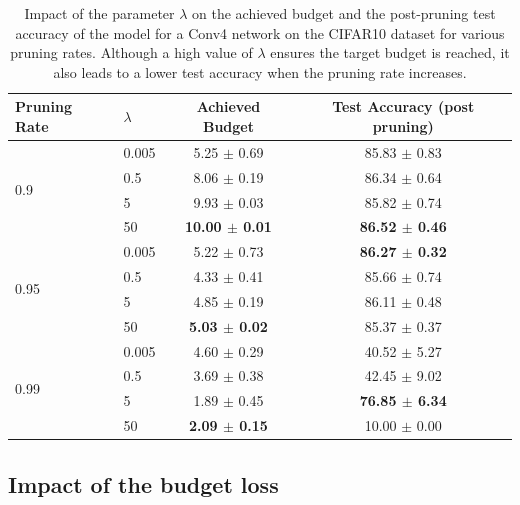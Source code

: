 \begin{table}[tbp]
  \centering
  \begin{center}
    \begin{tabular}{llcc}
      \toprule
      \textbf{Pruning Rate} & \textbf{$\lambda$} & \textbf{Achieved Budget} & \textbf{Test Accuracy (post pruning)} \\
      \midrule
      \multirow{4}{*}{0.9} & 0.005 & 5.25 $\pm$ 0.69 & 85.83 $\pm$ 0.83 \\
      & 0.5 & 8.06 $\pm$ 0.19 & 86.34 $\pm$ 0.64 \\
      & 5 & 9.93 $\pm$ 0.03 & 85.82 $\pm$ 0.74 \\
      & 50 & \textbf{10.00 $\pm$ 0.01} & \textbf{86.52 $\pm$ 0.46} \\
      \midrule
      \multirow{4}{*}{0.95} & 0.005 & 5.22 $\pm$ 0.73 & \textbf{86.27 $\pm$ 0.32} \\
      & 0.5 & 4.33 $\pm$ 0.41 & 85.66 $\pm$ 0.74 \\
      & 5 & 4.85 $\pm$ 0.19 & 86.11 $\pm$ 0.48 \\
      & 50 & \textbf{5.03 $\pm$ 0.02} & 85.37 $\pm$ 0.37 \\
      \midrule
      \multirow{4}{*}{0.99} & 0.005 & 4.60 $\pm$ 0.29 & 40.52 $\pm$ 5.27 \\
      & 0.5 & 3.69 $\pm$ 0.38 & 42.45 $\pm$ 9.02 \\
      & 5 & 1.89 $\pm$ 0.45 & \textbf{76.85 $\pm$ 6.34} \\
      & 50 & \textbf{2.09 $\pm$ 0.15} & 10.00 $\pm$ 0.00 \\
      \bottomrule
    \end{tabular}
  \end{center}
  \caption{
    Impact of the parameter $\lambda$ on the achieved budget and the post-pruning test accuracy of the model for a Conv4 network on the CIFAR10 dataset
    for various pruning rates. Although a high value of $\lambda$ ensures 
    the target budget is reached, it also leads to a lower test accuracy when
    the pruning rate increases.}
    \label{tab:chap1:lambda_impact}
\end{table}



\subsection{Impact of the budget loss}
\label{sec:chap1:impact_of_budget_loss}

